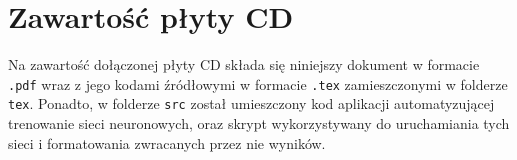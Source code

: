\chapter{Zawartość płyty CD}
\thispagestyle{chapterBeginStyle}
\label{plytaCD}

Na zawartość dołączonej płyty CD składa się niniejszy dokument w formacie \verb|.pdf| wraz z jego kodami źródłowymi w formacie \verb|.tex| zamieszczonymi w folderze \verb|tex|. Ponadto, w folderze \verb|src| został umieszczony kod aplikacji automatyzującej trenowanie sieci neuronowych, oraz skrypt wykorzystywany do uruchamiania tych sieci i formatowania zwracanych przez nie wyników.
